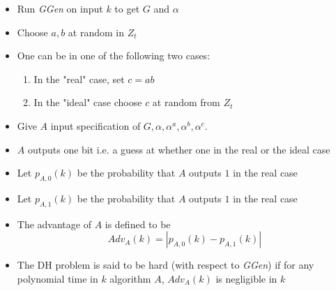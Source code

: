\begin{itemize}
  \begin{itemize}
  	\item Run \textit{GGen} on input $k$ to get $G$ and $\alpha$
  	\item Choose $a,b$ at random in $Z_t$
  	\item One can be in one of the following two cases:
    \begin{enumerate}[label=\alph*)]
  		\item In the "real" case, set $c=ab$
  		\item In the "ideal" case choose $c$ at random from $Z_t$
    \end{enumerate}
  	\item Give $A$ input specification of $G,\alpha, \alpha^a, \alpha^b, \alpha^c$.
  	\item $A$ outputs one bit i.e. a guess at whether one in the real or the ideal case
  	\item Let $p_{A,0}(k)$ be the probability that $A$ outputs $1$ in the real case
  	\item Let $p_{A,1}(k)$ be the probability that $A$ outputs $1$ in the real case
  	\item The advantage of $A$ is defined to be 
    \begin{equation*}
      Adv_A(k) = |p_{A,0}(k) - p_{A,1}(k)|  
    \end{equation*}
  	\item The DH problem is said to be hard (with respect to \textit{GGen}) if for any polynomial time in $k$ algorithm $A$, $Adv_A(k)$ is negligible in $k$
  \end{itemize}
\end{itemize}

